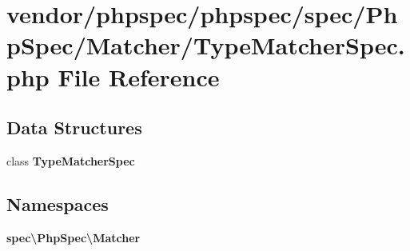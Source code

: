 \section{vendor/phpspec/phpspec/spec/\+Php\+Spec/\+Matcher/\+Type\+Matcher\+Spec.php File Reference}
\label{_type_matcher_spec_8php}
\subsection*{Data Structures}
\begin{DoxyCompactItemize}
\item 
class {\bf Type\+Matcher\+Spec}
\end{DoxyCompactItemize}
\subsection*{Namespaces}
\begin{DoxyCompactItemize}
\item 
 {\bf spec\textbackslash{}\+Php\+Spec\textbackslash{}\+Matcher}
\end{DoxyCompactItemize}
